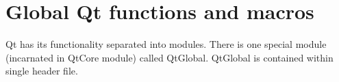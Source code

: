 \section{Global Qt functions and macros}
Qt has its functionality separated into modules. There is one special module (incarnated in QtCore module) called QtGlobal. QtGlobal is contained within single header file.